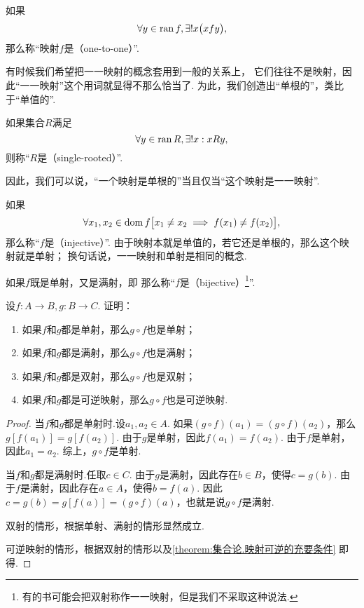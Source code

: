 如果\[
	\forall y \in \operatorname{ran} f,
	\exists! x \bigl( x f y \bigr),
\]
那么称“映射\(f\)是（one-to-one）”.

有时候我们希望把一一映射的概念套用到一般的关系上，
它们往往不是映射，因此“一一映射”这个用词就显得不那么恰当了.
为此，我们创造出“单根的”，类比于“单值的”.

\begin{definition}
如果集合\(R\)满足\[
	\forall y \in \operatorname{ran} R,
	\exists! x:
	x R y,
\]
则称“\(R\)是（single-rooted）”.
\end{definition}

因此，我们可以说，“一个映射是单根的”当且仅当“这个映射是一一映射”.

如果\[
	\forall x_1, x_2 \in \operatorname{dom} f
	\bigl[ x_1 \neq x_2 \implies f(x_1) \neq f(x_2) \bigr],
\]
那么称“\(f\)是（injective）”.
由于映射本就是单值的，若它还是单根的，那么这个映射就是单射；
换句话说，一一映射和单射是相同的概念.

如果\(f\)既是单射，又是满射，即
那么称“\(f\)是（bijective）\footnote{%
有的书可能会把双射称作一一映射，但是我们不采取这种说法.
}”.


\begin{example}
设\(f\colon A \to B, g\colon B \to C\).
证明：\begin{enumerate}
	\item 如果\(f\)和\(g\)都是单射，那么\(g \circ f\)也是单射；
	\item 如果\(f\)和\(g\)都是满射，那么\(g \circ f\)也是满射；
	\item 如果\(f\)和\(g\)都是双射，那么\(g \circ f\)也是双射；
	\item 如果\(f\)和\(g\)都是可逆映射，那么\(g \circ f\)也是可逆映射.
\end{enumerate}
\begin{proof}
当\(f\)和\(g\)都是单射时.设\(a_1,a_2 \in A\).
如果\((g \circ f)(a_1) = (g \circ f)(a_2)\)，那么\(g[f(a_1)] = g[f(a_2)]\).
由于\(g\)是单射，因此\(f(a_1) = f(a_2)\).
由于\(f\)是单射，因此\(a_1 = a_2\).
综上，\(g \circ f\)是单射.

当\(f\)和\(g\)都是满射时.任取\(c \in C\).
由于\(g\)是满射，因此存在\(b \in B\)，使得\(c = g(b)\).
由于\(f\)是满射，因此存在\(a \in A\)，使得\(b = f(a)\).
因此\(c = g(b) = g[f(a)] = (g \circ f)(a)\)，也就是说\(g \circ f\)是满射.

双射的情形，根据单射、满射的情形显然成立.

可逆映射的情形，根据双射的情形以及\cref{theorem:集合论.映射可逆的充要条件} 即得.
\end{proof}
\end{example}


